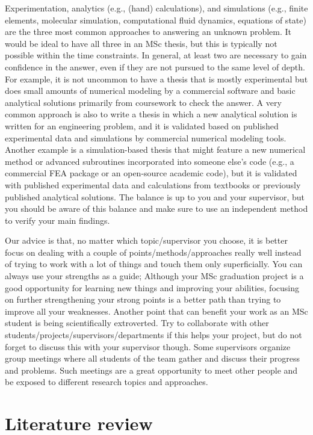 \documentclass{article}
\begin{document}
Experimentation, analytics (e.g., (hand) calculations), and simulations (e.g., finite elements, molecular simulation, computational fluid dynamics, equations of state) are the three most common approaches to answering an unknown problem. It would be ideal to have all three in an MSc thesis, but this is typically not possible within the time constraints. In general, at least two are necessary to gain confidence in the answer, even if they are not pursued to the same level of depth. For example, it is not uncommon to have a thesis that is mostly experimental but does small amounts of numerical modeling by a commercial software and basic analytical solutions primarily from coursework to check the answer. A very common approach is also to write a thesis in which a new analytical solution is written for an engineering problem, and it is validated based on published experimental data and simulations by commercial numerical modeling tools. Another example is a simulation-based thesis that might feature a new numerical method or advanced subroutines incorporated into someone else’s code (e.g., a commercial FEA package or an open-source academic code), but it is validated with published experimental data and calculations from textbooks or previously published analytical solutions. The balance is up to you and your supervisor, but you should be aware of this balance and make sure to use an independent method to verify your main findings. 

Our advice is that, no matter which topic/supervisor you choose, it is better focus on dealing with a couple of points/methods/approaches really well instead of trying to work with a lot of things and touch them only superficially. You can always use your strengths as a guide; Although your MSc graduation project is a good opportunity for learning new things and improving your abilities, focusing on further strengthening your strong points is a better path than trying to improve all your weaknesses. Another point that can benefit your work as an MSc student is being scientifically extroverted. Try to collaborate with other students/projects/supervisors/departments if this helps your project, but do not forget to discuss this with your supervisor though. Some supervisors organize group meetings where all students of the team gather and discuss their progress and problems. Such meetings are a great opportunity to meet other people and be exposed to different research topics and approaches. 


\section{Literature review}
\end{document}
